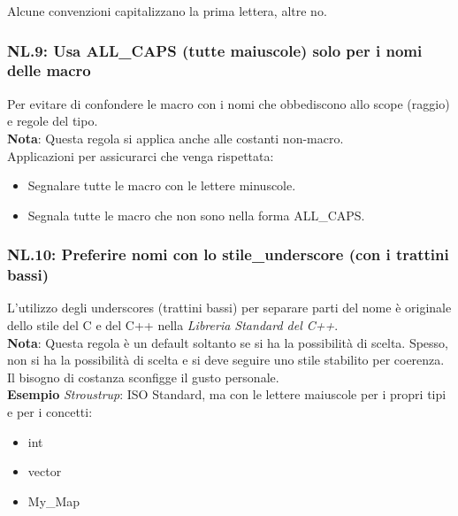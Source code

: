 \textsf{\small Alcune convenzioni capitalizzano la prima lettera, altre no.} \\

\subsubsection{NL.9: Usa ALL\_CAPS (tutte maiuscole) solo per i nomi delle macro}

\textsf{\small Per evitare di confondere le macro con i nomi che obbediscono allo scope (raggio) e regole del tipo.} \\

\textsf{\small \textbf{Nota}: Questa regola si applica anche alle costanti non-macro.} \\

\textsf{\small Applicazioni per assicurarci che venga rispettata: } 

\begin{itemize}
	\item \textsf{\small Segnalare tutte le macro con le lettere minuscole.}
	\item \textsf{\small Segnala tutte le macro che non sono nella forma ALL\_CAPS.}
\end{itemize}

\subsubsection{NL.10: Preferire nomi con lo stile\_underscore (con i trattini bassi)}

\textsf{\small L'utilizzo degli underscores (trattini bassi) per separare parti del nome è originale dello stile del C e del C++ nella \emph{Libreria Standard del C++}.} \\

\textsf{\small \textbf{Nota}: Questa regola è un default soltanto se si ha la possibilità di scelta. Spesso, non si ha la possibilità di scelta e si deve seguire uno stile stabilito per coerenza. Il bisogno di costanza sconfigge il gusto personale.} \\

\textsf{\small \textbf{Esempio} \emph{Stroustrup}: ISO Standard, ma con le lettere maiuscole per i propri tipi e per i concetti: }

\begin{itemize}
	\item \textsf{\small int}
	\item \textsf{\small vector}
	\item \textsf{\small My\_Map}
\end{itemize}

